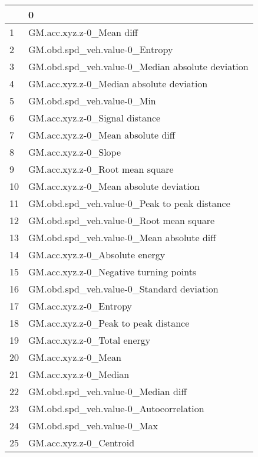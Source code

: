 \begin{tabular}{ll}
\toprule
{} &                                                 0 \\
\midrule
1  &                          GM.acc.xyz.z-0\_Mean diff \\
2  &                    GM.obd.spd\_veh.value-0\_Entropy \\
3  &  GM.obd.spd\_veh.value-0\_Median absolute deviation \\
4  &          GM.acc.xyz.z-0\_Median absolute deviation \\
5  &                        GM.obd.spd\_veh.value-0\_Min \\
6  &                    GM.acc.xyz.z-0\_Signal distance \\
7  &                 GM.acc.xyz.z-0\_Mean absolute diff \\
8  &                              GM.acc.xyz.z-0\_Slope \\
9  &                   GM.acc.xyz.z-0\_Root mean square \\
10 &            GM.acc.xyz.z-0\_Mean absolute deviation \\
11 &      GM.obd.spd\_veh.value-0\_Peak to peak distance \\
12 &           GM.obd.spd\_veh.value-0\_Root mean square \\
13 &         GM.obd.spd\_veh.value-0\_Mean absolute diff \\
14 &                    GM.acc.xyz.z-0\_Absolute energy \\
15 &            GM.acc.xyz.z-0\_Negative turning points \\
16 &         GM.obd.spd\_veh.value-0\_Standard deviation \\
17 &                            GM.acc.xyz.z-0\_Entropy \\
18 &              GM.acc.xyz.z-0\_Peak to peak distance \\
19 &                       GM.acc.xyz.z-0\_Total energy \\
20 &                               GM.acc.xyz.z-0\_Mean \\
21 &                             GM.acc.xyz.z-0\_Median \\
22 &                GM.obd.spd\_veh.value-0\_Median diff \\
23 &            GM.obd.spd\_veh.value-0\_Autocorrelation \\
24 &                        GM.obd.spd\_veh.value-0\_Max \\
25 &                           GM.acc.xyz.z-0\_Centroid \\

\end{tabular}
